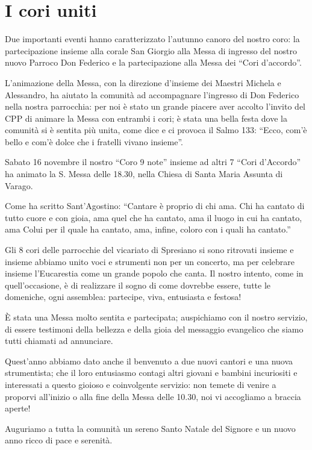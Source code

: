 \section{I cori uniti}

Due importanti eventi hanno caratterizzato l'autunno canoro del nostro coro: la partecipazione insieme alla corale San Giorgio alla Messa di ingresso del nostro nuovo Parroco Don Federico e la partecipazione alla Messa dei ``Cori d'accordo''.

L'animazione della Messa, con la direzione d'insieme dei Maestri Michela e Alessandro, ha aiutato la comunità ad accompagnare l'ingresso di Don Federico nella nostra parrocchia: per noi è stato un grande piacere aver accolto l'invito del CPP di animare la Messa con entrambi i cori; è stata una bella festa dove la comunità si è sentita più unita, come dice e ci provoca il Salmo 133: ``Ecco, com'è bello e com'è dolce che i fratelli vivano insieme''.

Sabato 16 novembre il nostro ``Coro 9 note'' insieme ad altri 7 ``Cori d'Accordo'' ha animato la S. Messa delle 18.30, nella Chiesa di Santa Maria Assunta di Varago.


Come ha scritto Sant'Agostino:
``Cantare è proprio di chi ama. Chi ha cantato di tutto cuore e con gioia, ama quel che ha cantato, ama il luogo in cui ha cantato, ama Colui per il quale ha cantato, ama, infine, coloro con i quali ha cantato.''

Gli 8 cori delle parrocchie del vicariato di Spresiano si sono ritrovati insieme e insieme abbiamo unito voci e strumenti non per un concerto, ma per celebrare insieme l'Eucarestia come un grande popolo che canta.
Il nostro intento, come in quell'occasione, è di realizzare il sogno di come dovrebbe essere, tutte le domeniche, ogni assemblea: partecipe, viva, entusiasta e festosa!



È stata una Messa molto sentita e partecipata; auspichiamo con il nostro servizio, di essere testimoni della bellezza e della gioia del messaggio evangelico che siamo tutti chiamati ad annunciare.

Quest'anno abbiamo dato anche il benvenuto a due nuovi cantori e una nuova strumentista; che il loro entusiasmo contagi altri giovani e bambini incuriositi e interessati a questo gioioso e coinvolgente servizio: non temete di venire a proporvi all'inizio o alla fine della Messa delle 10.30, noi vi accogliamo a braccia aperte!

Auguriamo a tutta la comunità un sereno Santo Natale del Signore e un nuovo anno ricco di pace e serenità.



